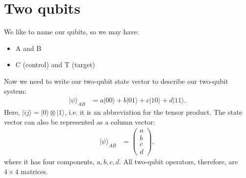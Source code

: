 \documentclass[lasers.tex]{subfiles}
\begin{document}
\section{Two qubits}
We like to name our qubits, so we may have:
\begin{itemize}
    \item A and B
    \item C (control) and T (target)
\end{itemize}
Now we need to write our two-qubit state vector to describe our two-qubit system:
\begin{align}
    |\psi\rangle_{AB} &= a|00\rangle + b|01\rangle + c|10\rangle + d|11\rangle.
\end{align}
Here, $|ij\rangle=|0\rangle\otimes|1\rangle$, i.e. it is an abbreviation for the tensor product. 
The state vector can also be represented as a column vector:
\begin{align}
    |\psi\rangle_{AB} &= \begin{pmatrix} a \\ b \\ c \\ d\end{pmatrix},
\end{align}
where it has four components, $a,b,c,d$.
All two-qubit operators, therefore, are $4\times4$ matrices.
\end{document}
